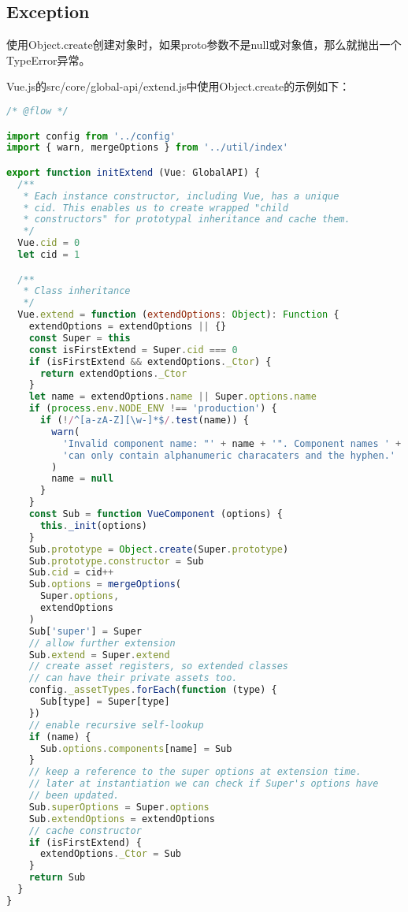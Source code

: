 \subsection{Exception}

使用Object.create创建对象时，如果proto参数不是null或对象值，那么就抛出一个TypeError异常。



Vue.js的src/core/global-api/extend.js中使用Object.create的示例如下：




\begin{lstlisting}[language=JavaScript]
/* @flow */

import config from '../config'
import { warn, mergeOptions } from '../util/index'

export function initExtend (Vue: GlobalAPI) {
  /**
   * Each instance constructor, including Vue, has a unique
   * cid. This enables us to create wrapped "child
   * constructors" for prototypal inheritance and cache them.
   */
  Vue.cid = 0
  let cid = 1

  /**
   * Class inheritance
   */
  Vue.extend = function (extendOptions: Object): Function {
    extendOptions = extendOptions || {}
    const Super = this
    const isFirstExtend = Super.cid === 0
    if (isFirstExtend && extendOptions._Ctor) {
      return extendOptions._Ctor
    }
    let name = extendOptions.name || Super.options.name
    if (process.env.NODE_ENV !== 'production') {
      if (!/^[a-zA-Z][\w-]*$/.test(name)) {
        warn(
          'Invalid component name: "' + name + '". Component names ' +
          'can only contain alphanumeric characaters and the hyphen.'
        )
        name = null
      }
    }
    const Sub = function VueComponent (options) {
      this._init(options)
    }
    Sub.prototype = Object.create(Super.prototype)
    Sub.prototype.constructor = Sub
    Sub.cid = cid++
    Sub.options = mergeOptions(
      Super.options,
      extendOptions
    )
    Sub['super'] = Super
    // allow further extension
    Sub.extend = Super.extend
    // create asset registers, so extended classes
    // can have their private assets too.
    config._assetTypes.forEach(function (type) {
      Sub[type] = Super[type]
    })
    // enable recursive self-lookup
    if (name) {
      Sub.options.components[name] = Sub
    }
    // keep a reference to the super options at extension time.
    // later at instantiation we can check if Super's options have
    // been updated.
    Sub.superOptions = Super.options
    Sub.extendOptions = extendOptions
    // cache constructor
    if (isFirstExtend) {
      extendOptions._Ctor = Sub
    }
    return Sub
  }
}
\end{lstlisting}






